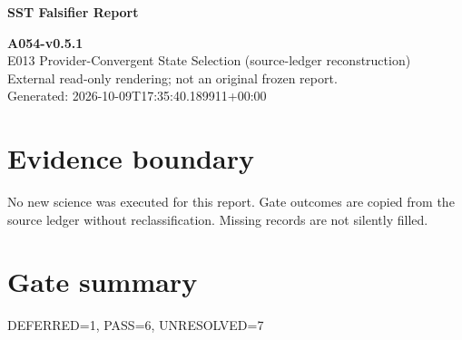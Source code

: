 \documentclass[10pt,a4paper]{article}
\begin{document}
\color{navy}\Huge\bfseries SST Falsifier Report\par\normalsize\mdseries\color{black}
\textbf{A054-v0.5.1}\\
E013 Provider-Convergent State Selection (source-ledger reconstruction)\\
External read-only rendering; not an original frozen report.\\
Generated: 2026-10-09T17:35:40.189911+00:00\\
\section*{Evidence boundary}
No new science was executed for this report. Gate outcomes are copied from the source ledger without reclassification. Missing records are not silently filled.
\section*{Gate summary}
DEFERRED=1, PASS=6, UNRESOLVED=7
\end{document}
